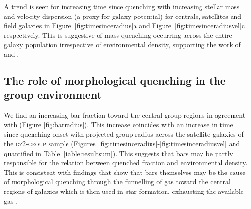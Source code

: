 \documentclass[useAMS,usenatbib]{mn2e}
\begin{document}
A trend is seen for increasing time since quenching with increasing stellar mass and velocity dispersion (a proxy for galaxy potential) for centrals, satellites and field galaxies in Figure~\ref{fig:timesinceradius}a and Figure~\ref{fig:timesinceradiusvel}c respectively. This is suggestive of mass quenching occurring across the entire galaxy population irrespective of environmental density, supporting the work of \citet{peng10, peng12, Gabor10} and \citet{darvish16}.

\subsection{The role of morphological quenching in the group environment}\label{sec:rolemorphenv}

We find an increasing bar fraction toward the central group regions in agreement with \cite{skibba12} (Figure \ref{fig:barradius}). This increase coincides with an increase in time since quenching onset with projected group radius across the satellite galaxies of the \textsc{gz2-group} sample (Figures~\ref{fig:timesinceradius}-\ref{fig:timesinceradiusvel} and quantified in Table~\ref{table:resultsum}). This suggests that bars may be partly responsible for the relation between quenched fraction and environmental density. This is consistent with findings that show that bars themselves may be the cause of morphological quenching through the funnelling of gas toward the central regions of galaxies \citep{athanassoula92b, sheth05} which is then used in star formation, exhausting the available gas \citep[][and see Section~\ref{sec:morphquench}]{masters12a}.

\end{document}
